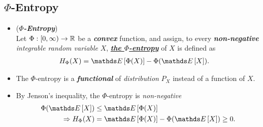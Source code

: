 \documentclass[11pt]{article}
\begin{document}
\subsection{$\Phi$-Entropy}
\begin{itemize}
\item \begin{definition}(\textbf{\emph{$\Phi$-Entropy}})\citep{boucheron2013concentration}\\
Let $\Phi: [0, \infty) \rightarrow {\mathbb R}$ be a \textbf{\emph{convex}} function, and assign, to every \emph{\textbf{non-negative} integrable random variable} $X$, \underline{\textbf{\emph{the $\Phi$-entropy}}} of $X$ is defined as 
\begin{align}
H_{\Phi}(X) &= \E{}{\Phi(X)} - \Phi(\E{}{X}). \label{def: phi_entropy}
\end{align}
\end{definition}

\item \begin{remark}
The $\Phi$-entropy is a \emph{\textbf{functional}} of \emph{distribution} $P_{X}$ instead of a function of $X$.
\end{remark}

\item \begin{remark}
By Jenson's inequality, the $\Phi$-entropy is \emph{non-negative}
\begin{align*}
\Phi(\E{}{X}) &\le \E{}{\Phi(X)}\\
\Rightarrow H_{\Phi}(X) &= \E{}{\Phi(X)} - \Phi(\E{}{X}) \ge 0.
\end{align*} 
\end{remark}


\end{itemize}
\end{document}

